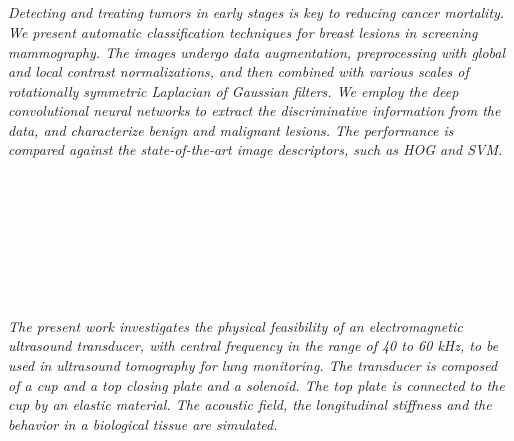 \begin{multicols}{2}
\\ 
      \\
      \\\\
      \\
      \\\\
      \\
      \\\\
      \\
      \\\\
\\
    \textit{Detecting and treating tumors in early stages is key to reducing cancer mortality. We present automatic classification techniques for breast lesions in screening mammography. The images undergo data augmentation, preprocessing with global and local contrast normalizations, and then combined with various scales of rotationally symmetric Laplacian of Gaussian filters. We employ the deep convolutional neural networks to extract the discriminative information from the data, and characterize benign and malignant lesions. The performance is compared against the state-of-the-art image descriptors, such as HOG and SVM.}\\
\\ 
      \\
      \\\\
      \\
      \\\\
\\
    \textit{The present work investigates the physical feasibility of an electromagnetic ultrasound transducer, with central frequency in the range of 40 to 60 kHz, to be used in ultrasound tomography for lung monitoring. The transducer is composed of a cup and a top closing plate and a solenoid. The top plate is connected to the cup by an elastic material. The acoustic field, the longitudinal stiffness and the behavior in a biological tissue are simulated.}\\
\\ 
      \\

\end{multicols}
